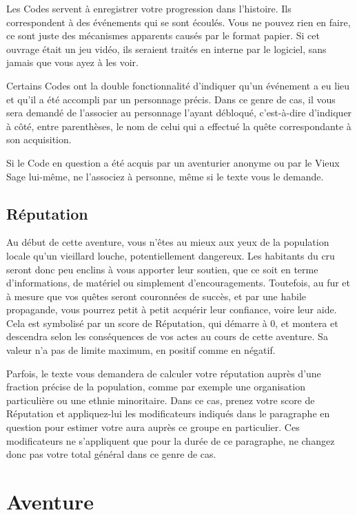 \documentclass{report}
\begin{document}
Les Codes servent à enregistrer votre progression dans l'histoire. Ils correspondent à des événements qui se sont écoulés. Vous ne pouvez rien en faire, ce sont juste des mécanismes apparents causés par le format papier. Si cet ouvrage était un jeu vidéo, ils seraient traités en interne par le logiciel, sans jamais que vous ayez à les voir.

Certains Codes ont la double fonctionnalité d'indiquer qu'un événement a eu lieu et qu'il a été accompli par un personnage précis. Dans ce genre de cas, il vous sera demandé de l'associer au personnage l'ayant débloqué, c'est-à-dire d'indiquer à côté, entre parenthèses, le nom de celui qui a effectué la quête correspondante à son acquisition.

Si le Code en question a été acquis par un aventurier anonyme ou par le Vieux Sage lui-même, ne l'associez à personne, même si le texte vous le demande.

\section{Réputation}

Au début de cette aventure, vous n'êtes au mieux aux yeux de la population locale qu'un vieillard louche, potentiellement dangereux. Les habitants du cru seront donc peu enclins à vous apporter leur soutien, que ce soit en terme d'informations, de matériel ou simplement d'encouragements. Toutefois, au fur et à mesure que vos quêtes seront couronnées de succès, et par une habile propagande, vous pourrez petit à petit acquérir leur confiance, voire leur aide.
Cela est symbolisé par un score de Réputation, qui démarre à 0, et montera et descendra selon les conséquences de vos actes au cours de cette aventure. Sa valeur n'a pas de limite maximum, en positif comme en négatif.

Parfois, le texte vous demandera de calculer votre réputation auprès d'une fraction précise de la population, comme par exemple une organisation particulière ou une ethnie minoritaire. Dans ce cas, prenez votre score de Réputation et appliquez-lui les modificateurs indiqués dans le paragraphe en question pour estimer votre aura auprès ce groupe en particulier. Ces modificateurs ne s'appliquent que pour la durée de ce paragraphe, ne changez donc pas votre total général dans ce genre de cas.

\chapter{Aventure}
\end{document}
